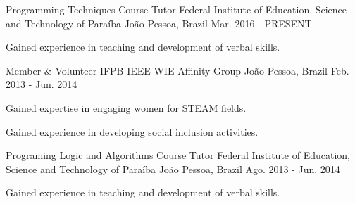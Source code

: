 \begin{cventries}
  \cventry
    {Programming Techniques Course Tutor} %
    {Federal Institute of Education, Science and Technology of Paraíba} %
    {João Pessoa, Brazil} %
    {Mar. 2016 - PRESENT} %
    {
      \begin{cvitems} %
        \item {Gained experience in teaching and development of verbal skills.}
      \end{cvitems}
    }
  \cventry
    {Member \& Volunteer} %
    {IFPB IEEE WIE Affinity Group} %
    {João Pessoa, Brazil} %
    {Feb. 2013 - Jun. 2014} %
    {
      \begin{cvitems} %
		\item{Gained expertise in engaging women for STEAM fields.}
		\item{Gained experience in developing social inclusion activities.}
      \end{cvitems}
    }
  \cventry
    {Programing Logic and Algorithms Course Tutor} %
    {Federal Institute of Education, Science and Technology of Paraíba} %
    {João Pessoa, Brazil} %
    {Ago. 2013 - Jun. 2014} %
    {
      \begin{cvitems} %
        \item {Gained experience in teaching and development of verbal skills.}
      \end{cvitems}
    }
\end{cventries}
